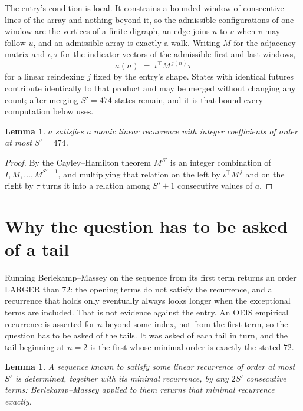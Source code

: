 \documentclass[11pt,a4paper]{article}
\theoremstyle{plain}
\newtheorem{lemma}[theorem]{Lemma}
\theoremstyle{definition}
\begin{document}
The entry's condition is local. It constrains a bounded window of consecutive lines of the
array and nothing beyond it, so the admissible configurations of one window are the vertices of
a finite digraph, an edge joins $u$ to $v$ when $v$ may follow $u$, and an admissible array is
exactly a walk. Writing $M$ for the adjacency matrix and $\iota,\tau$ for the indicator vectors
of the admissible first and last windows,
\[
a(n)\;=\;\iota^{\!\top}M^{\,j(n)}\tau
\]
for a linear reindexing $j$ fixed by the entry's shape. States with identical futures
contribute identically to that product and may be merged without changing any count; after
merging $S'=474$ states remain, and it is that bound every computation below uses.

\begin{lemma}\label{lem:cf}
$a$ satisfies a monic linear recurrence with integer coefficients of order at most $S'=474$.
\end{lemma}

\begin{proof}
By the Cayley--Hamilton theorem $M^{S'}$ is an integer combination of $I,M,\dots,M^{S'-1}$,
and multiplying that relation on the left by $\iota^{\!\top}M^{\,j}$ and on the right by
$\tau$ turns it into a relation among $S'+1$ consecutive values of $a$.
\end{proof}

\section{Why the question has to be asked of a tail}

Running Berlekamp--Massey on the sequence from its first term returns an order LARGER than $72$: the opening terms do not satisfy the recurrence, and a recurrence that holds only eventually always looks longer when the exceptional terms are included. That is not evidence against the entry. An OEIS empirical recurrence is asserted for $n$ beyond some index, not from the first term, so the question has to be asked of the tails. It was asked of each tail in turn, and the tail beginning at $n=2$ is the first whose minimal order is exactly the stated $72$.

\begin{lemma}\label{lem:bm}
A sequence known to satisfy some linear recurrence of order at most $S'$ is determined,
together with its minimal recurrence, by any $2S'$ consecutive terms: Berlekamp--Massey applied
to them returns that minimal recurrence exactly.
\end{lemma}
\end{document}
